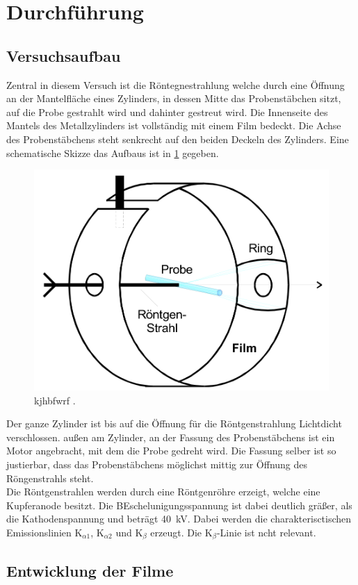 \section{Durchführung}
\label{sec:Durchführung}
\subsection{Versuchsaufbau}
Zentral in diesem Versuch ist die Röntegnestrahlung welche durch eine Öffnung an der Mantelfläche eines Zylinders, in dessen Mitte das Probenstäbchen sitzt, auf die Probe gestrahlt wird und dahinter gestreut wird. Die Innenseite des Mantels des Metallzylinders ist vollständig mit einem Film bedeckt.
Die Achse des Probenstäbchens steht senkrecht auf den beiden Deckeln des Zylinders. Eine schematische Skizze das Aufbaus ist in \ref{fig:Aufbau} gegeben.
\begin{figure}
	\centering
	\includegraphics[width = \textwidth]{Abbildungen/Aufbau.png}
	\caption{kjhbfwrf \cite{Anleitung}. }
	\label{fig:Aufbau}
\end{figure}  
Der ganze Zylinder ist bis auf die Öffnung für die Röntgenstrahlung Lichtdicht verschlossen.
außen am Zylinder, an der Fassung des Probenstäbchens ist ein Motor angebracht, mit dem die Probe gedreht wird. 
Die Fassung selber ist so justierbar, dass das Probenstäbchens möglichst mittig zur Öffnung des Röngenstrahls steht.\\
Die Röntgenstrahlen werden durch eine Röntgenröhre erzeigt, welche eine Kupferanode besitzt.
Die BEschelunigungsspannung ist dabei deutlich gräßer, als die Kathodenspannung und beträgt \SI{40}{\kV}. 
Dabei werden die charakterisctischen Emissionslinien K$_{\alpha 1}$, K$_{\alpha 2}$ und K$_\beta$ erzeugt. 
Die K$_\beta$-Linie ist ncht relevant.  


\subsection{Entwicklung der Filme}








